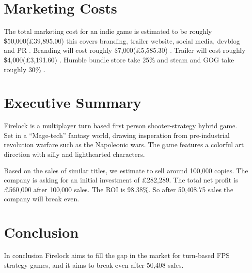 \documentclass{scrartcl}
\begin{document}
\section{Marketing Costs}

The total marketing cost for an indie game is estimated to be roughly \$50,000(\pounds 39,895.00) this covers branding, trailer website, social media, devblog and PR \cite{marketingGame}.
Branding will cost roughly \$7,000(\pounds 5,585.30) \cite{marketingGame}.
Trailer will cost roughly \$4,000(\pounds 3,191.60) \cite{marketingGame}.
Humble bundle store take 25\% \cite{HumblebundleFAQ} and steam and GOG take roughly 30\% \cite{ValveCut}.


\section{Executive Summary}
Firelock is a multiplayer turn based first person shooter-strategy hybrid game.
Set in a ``Mage-tech'' fantasy world, drawing insperation from pre-industrial revolution warfare such as the Napoleonic wars.
The game features a colorful art direction with silly and lighthearted characters.
\par

Based on the sales of similar titles, we estimate to sell around 100,000 copies.
The company is asking for an initial investment of \pounds 282,289.
The total net profit is \pounds 560,000 after 100,000 sales.
The ROI is 98.38\%.
So after 50,408.75 sales the company will break even. 


\section{Conclusion}
In conclusion Firelock aims to fill the gap in the market for turn-based FPS strategy games, and it aims to break-even after 50,408 sales.






\end{document}
